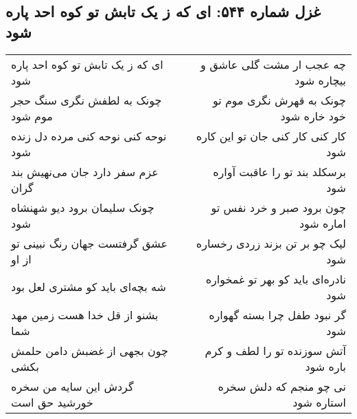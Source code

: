 \begin{center}
\section*{غزل شماره ۵۴۴: ای که ز یک تابش تو کوه احد پاره شود}
\label{sec:0544}
\begin{longtable}{l p{0.5cm} r}
ای که ز یک تابش تو کوه احد پاره شود
&&
چه عجب ار مشت گلی عاشق و بیچاره شود
\\
چونک به لطفش نگری سنگ حجر موم شود
&&
چونک به قهرش نگری موم تو خود خاره شود
\\
نوحه کنی نوحه کنی مرده دل زنده شود
&&
کار کنی کار کنی جان تو این کاره شود
\\
عزم سفر دارد جان می‌نهیش بند گران
&&
برسکلد بند تو را عاقبت آواره شود
\\
چونک سلیمان برود دیو شهنشاه شود
&&
چون برود صبر و خرد نفس تو اماره شود
\\
عشق گرفتست جهان رنگ نبینی تو از او
&&
لیک چو بر تن بزند زردی رخساره شود
\\
شه بچه‌ای باید کو مشتری لعل بود
&&
نادره‌ای باید کو بهر تو غمخواره شود
\\
بشنو از قل خدا هست زمین مهد شما
&&
گر نبود طفل چرا بسته گهواره شود
\\
چون بجهی از غضبش دامن حلمش بکشی
&&
آتش سوزنده تو را لطف و کرم باره شود
\\
گردش این سایه من سخره خورشید حق است
&&
نی چو منجم که دلش سخره استاره شود
\\
\end{longtable}
\end{center}
